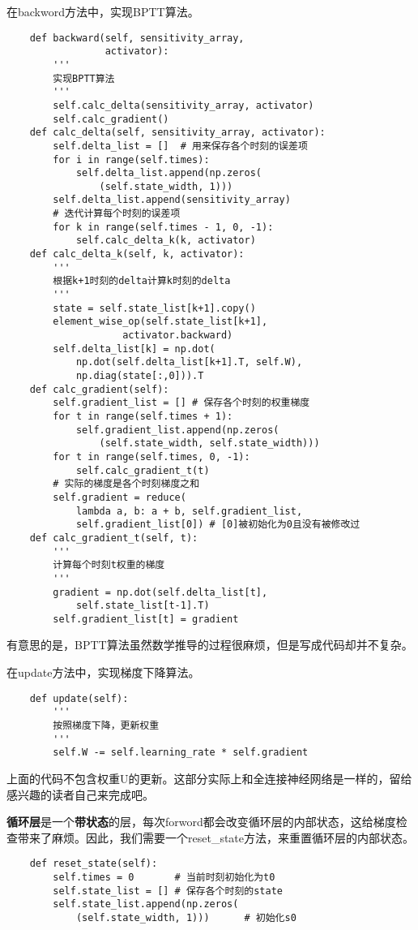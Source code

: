 在backword方法中，实现BPTT算法。
\begin{lstlisting}
    def backward(self, sensitivity_array, 
                 activator):
        '''
        实现BPTT算法
        '''
        self.calc_delta(sensitivity_array, activator)
        self.calc_gradient()
    def calc_delta(self, sensitivity_array, activator):
        self.delta_list = []  # 用来保存各个时刻的误差项
        for i in range(self.times):
            self.delta_list.append(np.zeros(
                (self.state_width, 1)))
        self.delta_list.append(sensitivity_array)
        # 迭代计算每个时刻的误差项
        for k in range(self.times - 1, 0, -1):
            self.calc_delta_k(k, activator)
    def calc_delta_k(self, k, activator):
        '''
        根据k+1时刻的delta计算k时刻的delta
        '''
        state = self.state_list[k+1].copy()
        element_wise_op(self.state_list[k+1],
                    activator.backward)
        self.delta_list[k] = np.dot(
            np.dot(self.delta_list[k+1].T, self.W),
            np.diag(state[:,0])).T
    def calc_gradient(self):
        self.gradient_list = [] # 保存各个时刻的权重梯度
        for t in range(self.times + 1):
            self.gradient_list.append(np.zeros(
                (self.state_width, self.state_width)))
        for t in range(self.times, 0, -1):
            self.calc_gradient_t(t)
        # 实际的梯度是各个时刻梯度之和
        self.gradient = reduce(
            lambda a, b: a + b, self.gradient_list,
            self.gradient_list[0]) # [0]被初始化为0且没有被修改过
    def calc_gradient_t(self, t):
        '''
        计算每个时刻t权重的梯度
        '''
        gradient = np.dot(self.delta_list[t],
            self.state_list[t-1].T)
        self.gradient_list[t] = gradient
\end{lstlisting}

有意思的是，BPTT算法虽然数学推导的过程很麻烦，但是写成代码却并不复杂。

在update方法中，实现梯度下降算法。
\begin{lstlisting}
    def update(self):
        '''
        按照梯度下降，更新权重
        '''
        self.W -= self.learning_rate * self.gradient
\end{lstlisting}

上面的代码不包含权重U的更新。这部分实际上和全连接神经网络是一样的，留给感兴趣的读者自己来完成吧。

\textbf{循环层}是一个\textbf{带状态}的层，每次forword都会改变循环层的内部状态，这给梯度检查带来了麻烦。因此，我们需要一个reset\_state方法，来重置循环层的内部状态。
\begin{lstlisting}
    def reset_state(self):
        self.times = 0       # 当前时刻初始化为t0
        self.state_list = [] # 保存各个时刻的state
        self.state_list.append(np.zeros(
            (self.state_width, 1)))      # 初始化s0
\end{lstlisting}

